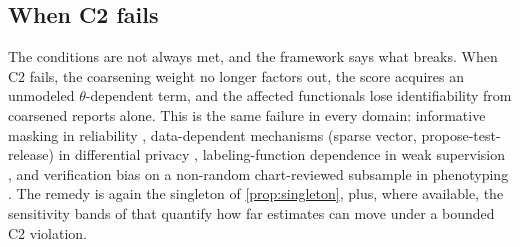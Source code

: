 \subsection{When C2 fails}

The conditions are not always met, and the framework says what breaks.
When C2 fails, the coarsening weight no longer factors out, the score
acquires an unmodeled $\theta$-dependent term, and the affected
functionals lose identifiability from coarsened reports alone. This is
the same failure in every domain: informative masking in reliability
\citep{towell2026mdrelax}, data-dependent mechanisms (sparse vector,
propose-test-release) in differential privacy
\citep{towell2026dpcoarsening}, labeling-function dependence in weak
supervision \citep{towell2026weaksupcoarsening}, and verification bias
on a non-random chart-reviewed subsample in phenotyping
\citep{towell2026phenotypecoarsening}. The remedy is again the
singleton of \cref{prop:singleton}, plus, where available, the
sensitivity bands of \citet{towell2026mdrelax} that quantify how far
estimates can move under a bounded C2 violation.
